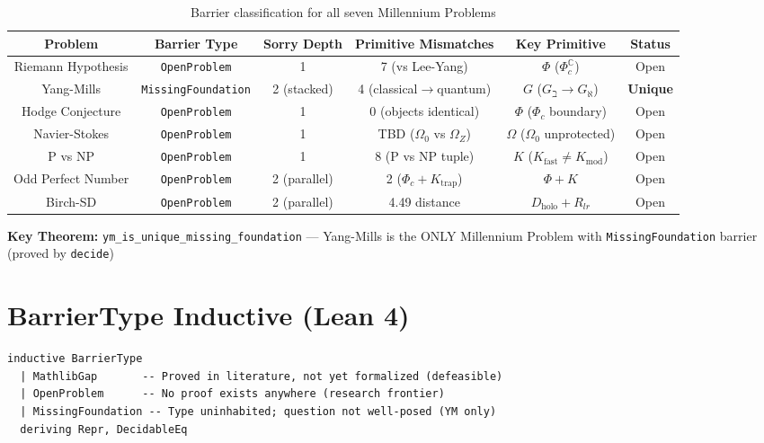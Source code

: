 \documentclass[11pt,a4paper]{article}
\begin{document}
\begin{table}[h!]
\centering
\caption{Barrier classification for all seven Millennium Problems}
\label{tab:millennium}
\begin{tabular}{c c c c c c}
\toprule
\textbf{Problem} & \textbf{Barrier Type} & \textbf{Sorry Depth} & \textbf{Primitive Mismatches} & \textbf{Key Primitive} & \textbf{Status} \\
\midrule
Riemann Hypothesis & \texttt{OpenProblem} & 1 & 7 (vs Lee-Yang) & $\Phi$ ($\Phi_c^\mathbb{C}$) & Open \\
Yang-Mills & \textcolor{synthred}{\texttt{MissingFoundation}} & 2 (stacked) & 4 (classical$\to$quantum) & $G$ ($G_{\beth}{\to}G_{\aleph}$) & \textcolor{synthred}{\textbf{Unique}} \\
Hodge Conjecture & \texttt{OpenProblem} & 1 & 0 (objects identical) & $\Phi$ ($\Phi_c$ boundary) & Open \\
Navier-Stokes & \texttt{OpenProblem} & 1 & TBD ($\Omega_0$ vs $\Omega_Z$) & $\Omega$ ($\Omega_0$ unprotected) & Open \\
P vs NP & \texttt{OpenProblem} & 1 & 8 (P vs NP tuple) & $K$ ($K_{\text{fast}}{\neq}K_{\text{mod}}$) & Open \\
Odd Perfect Number & \texttt{OpenProblem} & 2 (parallel) & 2 ($\Phi_c + K_{\text{trap}}$) & $\Phi + K$ & Open \\
Birch-SD & \texttt{OpenProblem} & 2 (parallel) & 4.49 distance & $D_{\text{holo}} + R_{lr}$ & Open \\
\bottomrule
\end{tabular}
\end{table}

\noindent \textbf{Key Theorem:} \texttt{ym\_is\_unique\_missing\_foundation} — Yang-Mills is the ONLY Millennium Problem with \texttt{MissingFoundation} barrier (proved by \texttt{decide})

\section{BarrierType Inductive (Lean 4)}

\begin{lstlisting}[language=Lean, frame=single, backgroundcolor=\color{gray!10}]
inductive BarrierType
  | MathlibGap       -- Proved in literature, not yet formalized (defeasible)
  | OpenProblem      -- No proof exists anywhere (research frontier)
  | MissingFoundation -- Type uninhabited; question not well-posed (YM only)
  deriving Repr, DecidableEq
\end{lstlisting}
\end{document}
